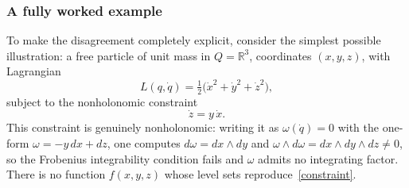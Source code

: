 \subsubsection{A fully worked example}

To make the disagreement completely explicit, consider the simplest possible
illustration: a free particle of unit mass in $Q = \mathbb{R}^3$, coordinates
$(x,y,z)$, with Lagrangian
\begin{equation}
L(q,\dot q) = \tfrac12\big(\dot x^2 + \dot y^2 + \dot z^2\big),
\end{equation}
subject to the nonholonomic constraint
\begin{equation}
\label{constraint}
\dot z = y\,\dot x .
\end{equation}
This constraint is genuinely nonholonomic: writing it as $\omega(\dot q) = 0$
with the one-form $\omega = -y\,dx + dz$, one computes $d\omega = dx\wedge dy$
and $\omega\wedge d\omega = dx\wedge dy \wedge dz \neq 0$, so the Frobenius
integrability condition fails and $\omega$ admits no integrating factor. There
is no function $f(x,y,z)$ whose level sets reproduce~\eqref{constraint}.

